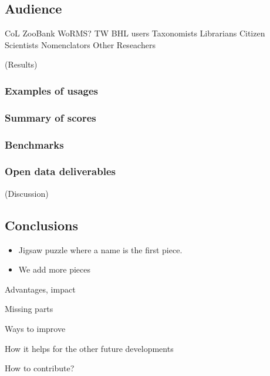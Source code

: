 \documentclass[
]{article}
\providecommand{\tightlist}{%
  \setlength{\itemsep}{0pt}\setlength{\parskip}{0pt}}
\begin{document}
\hypertarget{audience}{%
\subsection{Audience}\label{audience}}

CoL ZooBank WoRMS? TW BHL users Taxonomists Librarians Citizen
Scientists Nomenclators Other Reseachers

(Results)

\hypertarget{examples-of-usages}{%
\subsubsection{Examples of usages}\label{examples-of-usages}}

\hypertarget{summary-of-scores}{%
\subsubsection{Summary of scores}\label{summary-of-scores}}

\hypertarget{benchmarks}{%
\subsubsection{Benchmarks}\label{benchmarks}}

\hypertarget{open-data-deliverables}{%
\subsubsection{Open data deliverables}\label{open-data-deliverables}}

(Discussion)

\hypertarget{conclusions}{%
\subsection{Conclusions}\label{conclusions}}

\begin{itemize}
\tightlist
\item
  Jigsaw puzzle where a name is the first piece.
\item
  We add more pieces
\end{itemize}

Advantages, impact

Missing parts

Ways to improve

How it helps for the other future developments

How to contribute?
\end{document}

